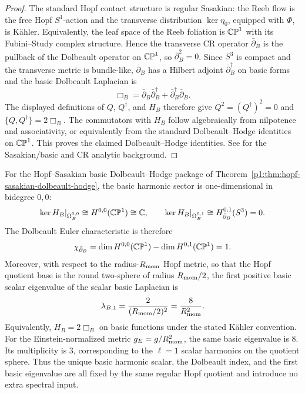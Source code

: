 \documentclass[11pt]{article}
\begin{document}
\begin{proof}
The standard Hopf contact structure is regular Sasakian: the Reeb flow is the
free Hopf \(S^1\)-action and the transverse distribution \(\ker\eta_0\), equipped
with \(\Phi\), is K\"ahler. Equivalently, the leaf space of the Reeb foliation is
\(\mathbb{CP}^1\) with its Fubini--Study complex structure. Hence the transverse CR
operator \(\bar\partial_B\) is the pullback of the Dolbeault operator on
\(\mathbb{CP}^1\), so \(\bar\partial_B^2=0\). Since \(S^3\) is compact and the transverse
metric is bundle-like, \(\bar\partial_B\) has a Hilbert adjoint
\(\bar\partial_B^\dagger\) on basic forms and the basic Dolbeault Laplacian is
\[
\Box_B=\bar\partial_B\bar\partial_B^\dagger+
\bar\partial_B^\dagger\bar\partial_B.
\]
The displayed definitions of \(Q\), \(Q^\dagger\), and \(H_B\) therefore give
\(Q^2=(Q^\dagger)^2=0\) and \(\{Q,Q^\dagger\}=2\Box_B\). The commutators with
\(H_B\) follow algebraically from nilpotence and associativity, or equivalently
from the standard Dolbeault--Hodge identities on \(\mathbb{CP}^1\). This proves the
claimed Dolbeault--Hodge identities. See
\cite{boyer2008sasakian,FollandStein1982} for the Sasakian/basic and CR analytic
background.
\end{proof}

\begin{theorem}
\label{p1:thm:hopf-basic-dolbeault-index}
\leavevmode\par\noindent
For the Hopf--\allowbreak Sasakian basic Dolbeault--\allowbreak Hodge package
of Theorem~\ref{p1:thm:hopf-sasakian-dolbeault-hodge}, the basic harmonic
sector is one-dimensional in bidegree \(0,0\):
\[
\ker H_B|_{\Omega_B^{0,0}}\cong H^{0,0}(\mathbb{CP}^1)\cong\mathbb C,
\qquad
\ker H_B|_{\Omega_B^{0,1}}\cong H_{\bar\partial_B}^{0,1}(S^3)=0.
\]
The Dolbeault Euler characteristic is therefore
\[
\chi_{\bar\partial_B}
=
\dim H^{0,0}(\mathbb{CP}^1)-\dim H^{0,1}(\mathbb{CP}^1)
=
1.
\]
Moreover, with respect to the radius-\(R_{\mathrm{mom}}\) Hopf metric, so that the Hopf
quotient base is the round two-sphere of radius \(R_{\mathrm{mom}}/2\), the first positive
basic scalar eigenvalue of the scalar basic Laplacian is
\[
\lambda_{B,1}
=
\frac{2}{(R_{\mathrm{mom}}/2)^2}
=
\frac{8}{R_{\mathrm{mom}}^2}.
\]
Equivalently, \(H_B=2\Box_B\) on basic functions under the stated Kähler
convention.  For the Einstein-normalized metric \(g_E=g/R_{\mathrm{mom}}^2\), the same
basic eigenvalue is \(8\).  Its multiplicity is \(3\), corresponding to the
\(\ell=1\) scalar harmonics on the quotient sphere.  Thus the unique basic
harmonic scalar, the Dolbeault index, and the first basic eigenvalue are all
fixed by the same regular Hopf quotient and introduce no extra spectral input.
\end{theorem}
\end{document}
